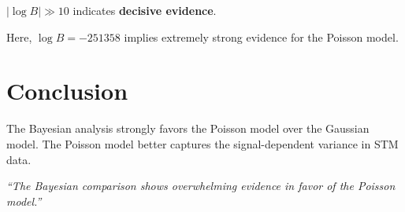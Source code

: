 \documentclass{article}
\begin{document}
$|\log B| \gg 10$ indicates \textbf{decisive evidence}.

Here, $\log B = -251358$ implies extremely strong evidence for the Poisson model.

\section{Conclusion}

The Bayesian analysis strongly favors the Poisson model over the Gaussian model. The Poisson model better captures the signal-dependent variance in STM data.

\bigskip

\textit{“The Bayesian comparison shows overwhelming evidence in favor of the Poisson model.”}
\end{document}
